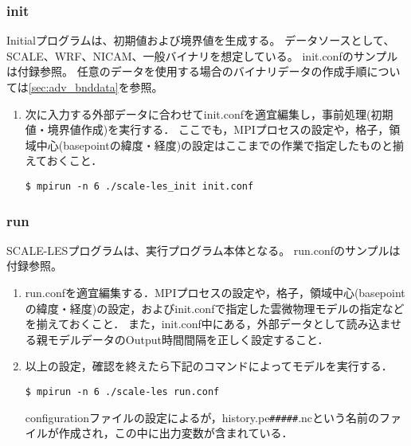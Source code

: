 \subsubsection{init}

Initialプログラムは、初期値および境界値を生成する。
データソースとして、SCALE、WRF、NICAM、一般バイナリを想定している。
init.confのサンプルは付録参照。
任意のデータを使用する場合のバイナリデータの作成手順については\ref{sec:adv_bnddata}を参照。

\begin{enumerate}
\item 次に入力する外部データに合わせてinit.confを適宜編集し，事前処理(初期値・境界値作成)を実行する．
ここでも，MPIプロセスの設定や，格子，領域中心(basepointの緯度・経度)の設定はここまでの作業で指定したものと揃えておくこと． 
\begin{verbatim}
$ mpirun -n 6 ./scale-les_init init.conf
\end{verbatim}
\end{enumerate}



\subsubsection{run}
SCALE-LESプログラムは、実行プログラム本体となる。
run.confのサンプルは付録参照。


\begin{enumerate}
\item run.confを適宜編集する．MPIプロセスの設定や，格子，領域中心(basepointの緯度・経度)の設定，およびinit.confで指定した雲微物理モデルの指定などを揃えておくこと．
また，init.conf中にある，外部データとして読み込ませる親モデルデータのOutput時間間隔を正しく設定すること．

\item 以上の設定，確認を終えたら下記のコマンドによってモデルを実行する．
\begin{verbatim}
$ mpirun -n 6 ./scale-les run.conf
\end{verbatim}
configurationファイルの設定によるが，history.pe\verb|#####|.ncという名前のファイルが作成され，この中に出力変数が含まれている．
\end{enumerate}




